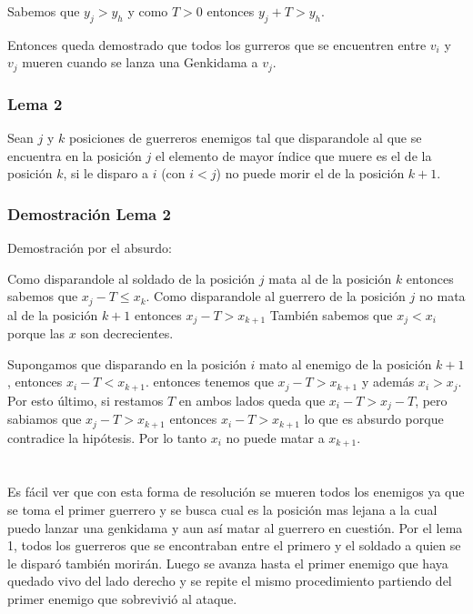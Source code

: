     			Sabemos que $y_{j} > y_{h}$ y como $T > 0$ entonces $y_{j} + T > y_{h}$.

    			Entonces queda demostrado que todos los gurreros que se encuentren entre $v_{i}$ y $v_{j}$ mueren cuando se lanza una Genkidama a $v_{j}$.

    		\subsubsection*{Lema 2}

    			Sean $j$ y $k$ posiciones de guerreros enemigos tal que disparandole al que se encuentra en la posición $j$ el elemento de mayor índice que muere es el de la posición $k$, si le disparo a $i$ (con $i < j$) no puede morir el de la posición $k+1$.


    		\subsubsection*{Demostración Lema 2}
    			Demostración por el absurdo:

    			Como disparandole al soldado de la posición $j$ mata al de la posición $k$ entonces sabemos que $x_{j} - T \leq x_{k}$.
    			Como disparandole al guerrero de la posición $j$ no mata al de la posición $k+1$ entonces $x_{j} - T > x_{k+1}$
    			También sabemos que $x_{j} < x_{i}$ porque las $x$ son decrecientes.

    			Supongamos que disparando en la posición $i$ mato al enemigo de la posición $k+1$, entonces $x_{i} - T < x_{k+1}$.
    			entonces tenemos que $x_{j} - T > x_{k+1}$ y además $x_{i} > x_{j}$. Por esto último, si restamos $T$ en ambos lados queda que $x_{i} - T > x_{j} - T$, pero sabiamos que $x_{j} - T > x_{k+1}$ entonces $x_{i} - T > x_{k+1}$ lo que es absurdo porque contradice la hipótesis. 
    			Por lo tanto $x_{i}$ no puede matar a $x_{k+1}$. \\
    			\\
    			\\


		Es fácil ver que con esta forma de resolución se mueren todos los enemigos ya que se toma el primer guerrero y se busca cual es la posición mas lejana a la cual puedo lanzar una genkidama y aun así matar al guerrero en cuestión. Por el lema 1, todos los guerreros que se encontraban entre el primero y el soldado a quien se le disparó también morirán. Luego se avanza hasta el primer enemigo que haya quedado vivo del lado derecho y se repite el mismo procedimiento partiendo del primer enemigo que sobrevivió al ataque. \\ 


